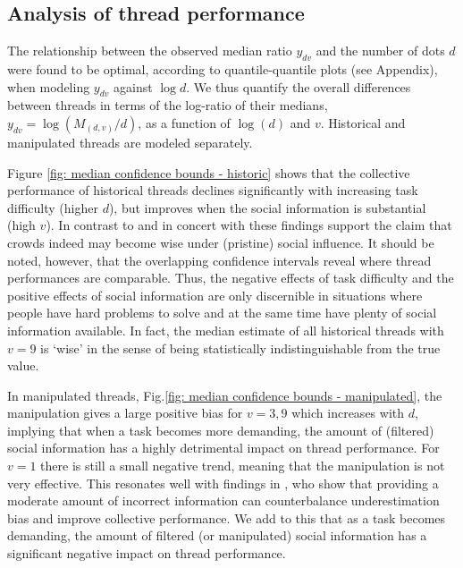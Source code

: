 \documentclass[9pt,twocolumn,twoside,lineno]{pnas-new}
\begin{document}
\subsection*{Analysis of thread performance}
The relationship between the observed median ratio $y_{dv}$ and the number of dots $d$ were found to be optimal, according to quantile-quantile plots (see Appendix), when modeling $y_{dv}$ against $\log{d}$. We thus quantify the overall differences between threads in terms of the log-ratio of their medians, $y_{dv}=\log(M_{(d,v)}/d)$, as a function of $\log(d)$ and $v$. Historical and manipulated threads are modeled separately.

Figure \ref{fig: median confidence bounds - historic} shows that the collective performance of historical threads declines significantly with increasing task difficulty (higher $d$), but improves when the social information is substantial (high $v$). In contrast to \cite{lorenz2011social, king2011true, minson2012cost} and in concert with \cite{gurccay2015power, becker2017network, jayles2017social, farrell2011social} these findings support the claim that crowds indeed may become wise under (pristine) social influence. It should be noted, however, that the overlapping confidence intervals reveal where thread performances are comparable. Thus, the negative effects of task difficulty and the positive effects of social information are only discernible in situations where people have hard problems to solve and at the same time have plenty of social information available. In fact, the median estimate of all historical threads with $v=9$ is `wise' in the sense of being statistically indistinguishable from the true value.

In manipulated threads, Fig.\ref{fig: median confidence bounds - manipulated}, the manipulation gives a large positive bias for $v=3,9$ which increases with $d$, implying that when a task becomes more demanding, the amount of (filtered) social information has a highly detrimental impact on thread performance. For $v=1$ there is still a small negative trend, meaning that the manipulation is not very effective. This resonates well with findings in \cite{jayles2017social}, who show that providing a moderate amount of incorrect information can counterbalance underestimation bias and improve collective performance. We add to this that as a task becomes demanding, the amount of filtered (or manipulated) social information has a significant negative impact on thread performance. %
\end{document}
